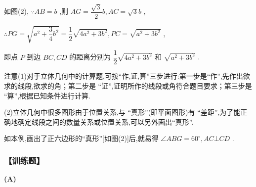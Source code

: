 如图(2), $\because {AB} = b$ ,则 ${AG} = \dfrac{\sqrt{3}}{2}b,{AC} = \sqrt{3}b$ ,

$\therefore {PG} = \sqrt{{a}^{2} + \dfrac{3}{4}{b}^{2}} = \dfrac{1}{2}\sqrt{4{a}^{2} + 3{b}^{2}},{PC} = \sqrt{{a}^{2} + 3{b}^{2}}$ ,

即点 $P$ 到边 ${BC},{CD}$ 的距离分别为 $\dfrac{1}{2}\sqrt{4{a}^{2} + 3{b}^{2}}$ 和 $\sqrt{{a}^{2} + 3{b}^{2}}$ .

注意(1)对于立体几何中的计算题,可按“作,证,算”三步进行:第一步是“作”,先作出欲求的线段,欲求的角；第二步是 “证”,证明所作的线段或角符合题目要求；第三步是 “算”,根据已知条件进行计算.

(2)立体几何中很多图形由于位置关系,与 “真形”(即平面图形)有 “差距”,为了能正确地确定线段之间的数量关系或位置关系,可以另外画出“真形”.

如本例,画出了正六边形的“真形”[如图(2)]后,就易得 $\angle {ABG} = {60}^{ \circ  },{AC} \bot  {CD}$ .

\subsubsection*{【训练题】}

\begin{center}  \textbf{(A)} \end{center}

